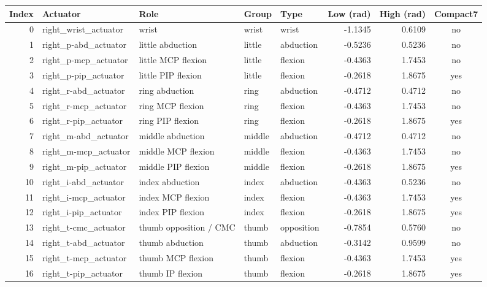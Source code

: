 \begin{tabular}{rllllrrc}
\toprule
Index & Actuator & Role & Group & Type & Low (rad) & High (rad) & Compact7 \\
\midrule
0 & right\_wrist\_actuator & wrist & wrist & wrist & -1.1345 & 0.6109 & no \\
1 & right\_p-abd\_actuator & little abduction & little & abduction & -0.5236 & 0.5236 & no \\
2 & right\_p-mcp\_actuator & little MCP flexion & little & flexion & -0.4363 & 1.7453 & no \\
3 & right\_p-pip\_actuator & little PIP flexion & little & flexion & -0.2618 & 1.8675 & yes \\
4 & right\_r-abd\_actuator & ring abduction & ring & abduction & -0.4712 & 0.4712 & no \\
5 & right\_r-mcp\_actuator & ring MCP flexion & ring & flexion & -0.4363 & 1.7453 & no \\
6 & right\_r-pip\_actuator & ring PIP flexion & ring & flexion & -0.2618 & 1.8675 & yes \\
7 & right\_m-abd\_actuator & middle abduction & middle & abduction & -0.4712 & 0.4712 & no \\
8 & right\_m-mcp\_actuator & middle MCP flexion & middle & flexion & -0.4363 & 1.7453 & no \\
9 & right\_m-pip\_actuator & middle PIP flexion & middle & flexion & -0.2618 & 1.8675 & yes \\
10 & right\_i-abd\_actuator & index abduction & index & abduction & -0.4363 & 0.5236 & no \\
11 & right\_i-mcp\_actuator & index MCP flexion & index & flexion & -0.4363 & 1.7453 & yes \\
12 & right\_i-pip\_actuator & index PIP flexion & index & flexion & -0.2618 & 1.8675 & yes \\
13 & right\_t-cmc\_actuator & thumb opposition / CMC & thumb & opposition & -0.7854 & 0.5760 & no \\
14 & right\_t-abd\_actuator & thumb abduction & thumb & abduction & -0.3142 & 0.9599 & no \\
15 & right\_t-mcp\_actuator & thumb MCP flexion & thumb & flexion & -0.4363 & 1.7453 & yes \\
16 & right\_t-pip\_actuator & thumb IP flexion & thumb & flexion & -0.2618 & 1.8675 & yes \\
\bottomrule
\end{tabular}
